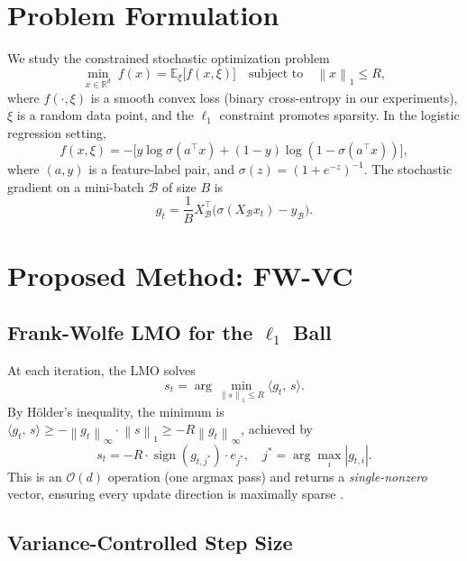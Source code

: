\documentclass[10pt,twocolumn]{article}
\newcommand{\norm}[1]{\left\|#1\right\|}
\newcommand{\E}{\mathbb{E}}
\newcommand{\R}{\mathbb{R}}
\newcommand{\inner}[2]{\langle #1,\, #2 \rangle}
\begin{document}
\section{Problem Formulation}
\label{sec:problem}

We study the constrained stochastic optimization problem
\begin{equation}
  \min_{x \in \R^d} \; f(x) = \E_{\xi}\bigl[f(x, \xi)\bigr]
  \quad \text{subject to} \quad \norm{x}_1 \leq R,
  \label{eq:problem}
\end{equation}
where $f(\cdot, \xi)$ is a smooth convex loss (binary cross-entropy in our
experiments), $\xi$ is a random data point, and the $\ell_1$ constraint
promotes sparsity. In the logistic regression setting,
\[
  f(x, \xi) = -\bigl[y \log \sigma(a^\top x) + (1-y)\log(1 - \sigma(a^\top x))\bigr],
\]
where $(a, y)$ is a feature-label pair, and $\sigma(z) = (1+e^{-z})^{-1}$.
The stochastic gradient on a mini-batch $\mathcal{B}$ of size $B$ is
\[
  g_t = \frac{1}{B} X_{\mathcal{B}}^\top \bigl(\sigma(X_{\mathcal{B}} x_t) - y_{\mathcal{B}}\bigr).
\]


\section{Proposed Method: FW-VC}
\label{sec:method}

\subsection{Frank-Wolfe LMO for the $\ell_1$ Ball}

At each iteration, the LMO solves
\[
  s_t = \arg\min_{\norm{s}_1 \leq R} \inner{g_t}{s}.
\]
By H\"{o}lder's inequality, the minimum is
$\inner{g_t}{s} \geq -\norm{g_t}_\infty \cdot \norm{s}_1 \geq -R\norm{g_t}_\infty$,
achieved by
\[
  s_t = -R \cdot \operatorname{sign}(g_{t,j^*}) \cdot e_{j^*},
  \quad j^* = \arg\max_i |g_{t,i}|.
\]
This is an $\mathcal{O}(d)$ operation (one argmax pass) and returns a
\emph{single-nonzero} vector, ensuring every update direction is maximally
sparse \cite{jaggi2013}.

\subsection{Variance-Controlled Step Size}
\end{document}
